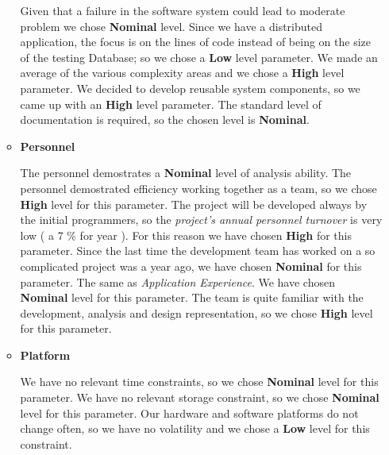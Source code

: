 \begin{itemize}
\begin{itemize}
		\begin{itemize}
			Given that a failure in the software system could lead to moderate problem we chose \textbf{Nominal} level.
			 Since we have a distributed application, the focus is on the lines of code instead of being on the size of the testing Database; so we chose a \textbf{Low} level parameter.
			 We made an average of the various complexity areas and we chose a \textbf{High} level parameter.
			 We decided to develop reusable system components, so we came up with an \textbf{High} level parameter.
			 The standard level of documentation is required, so the chosen level is \textbf{Nominal}.
		\end{itemize}
		\item \textbf{Personnel}
		\begin{itemize}
			 The personnel demostrates a \textbf{Nominal} level of analysis ability.
			 The personnel demostrated efficiency working together as a team, so we chose \textbf{High} level for this parameter.
			 The project will be developed always by the initial programmers, so the \textit{project's annual personnel turnover} is very low ( a 7 \% for year ). For this reason we have chosen \textbf{High} for this parameter.
			 Since the last time the development team has worked on a so complicated project was a year ago, we have chosen \textbf{Nominal} for this parameter.
			 The same as \textit{Application Experience}. We have chosen \textbf{Nominal} level for this parameter.
			 The team is quite familiar with the development, analysis and design representation, so we chose \textbf{High} level for this parameter.
		\end{itemize}
		\item \textbf{Platform}
		\begin{itemize}
			 We have no relevant time constraints, so we chose \textbf{Nominal} level for this parameter.
			 We have no relevant storage constraint, so we chose \textbf{Nominal} level for this parameter. 
			 Our hardware and software platforms do not change often, so we have no volatility and we chose a \textbf{Low} level for this constraint.

\end{itemize}
\end{itemize}
\end{itemize}
